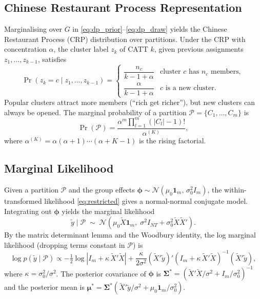 \documentclass[margin=3in, 12pt]{article}
\newcommand{\Normal}{\mathcal{N}}
\newcommand{\1}{\mathbbm{1}}
\begin{document}
\subsection{Chinese Restaurant Process Representation}

Marginalising over $G$ in \eqref{eq:dp_prior}--\eqref{eq:dp_draw} yields
the Chinese Restaurant Process (CRP) distribution over partitions. Under
the CRP with concentration $\alpha$, the cluster label $z_k$ of CATT $k$,
given previous assignments $z_1,\ldots,z_{k-1}$, satisfies
\begin{equation}
  \Pr(z_k = c \mid z_1,\ldots,z_{k-1}) =
  \begin{cases}
    \dfrac{n_c}{k-1+\alpha} & \text{cluster } c \text{ has } n_c \text{ members},\\[6pt]
    \dfrac{\alpha}{k-1+\alpha} & c \text{ is a new cluster.}
  \end{cases}
  \label{eq:crp}
\end{equation}
Popular clusters attract more members (``rich get richer''), but new clusters
can always be opened. The marginal probability of a partition
$\mathcal{P} = \{C_1,\ldots,C_m\}$ is
\begin{equation}
  \Pr(\mathcal{P}) = \frac{\alpha^m \prod_{l=1}^{m}(|C_l|-1)!}{\alpha^{(K)}},
  \label{eq:crp_partition}
\end{equation}
where $\alpha^{(K)} = \alpha(\alpha+1)\cdots(\alpha+K-1)$ is the rising
factorial.

\subsection{Marginal Likelihood}

Given a partition $\mathcal{P}$ and the group effects
$\bm{\phi} \sim \Normal(\mu_0\mathbf{1}_m,\, \sigma_0^2 I_m)$, the
within-transformed likelihood \eqref{eq:restricted} gives a normal-normal
conjugate model. Integrating out $\bm{\phi}$ yields the marginal likelihood
\begin{equation}
  \tilde{y} \mid \mathcal{P}
  \;\sim\; \Normal\!\left(\mu_0 \tilde{X}\mathbf{1}_m,\;
    \sigma^2 I_{NT} + \sigma_0^2 \tilde{X}\tilde{X}'\right).
  \label{eq:marglik}
\end{equation}
By the matrix determinant lemma and the Woodbury identity, the log
marginal likelihood (dropping terms constant in $\mathcal{P}$) is
\begin{equation}
  \log p(\tilde{y}\mid\mathcal{P})
  \propto
  -\tfrac{1}{2}\log|I_m + \kappa\,\tilde{X}'\tilde{X}|
  + \frac{\kappa}{2\sigma^2}(\tilde{X}'\tilde{y})'
    (I_m + \kappa\,\tilde{X}'\tilde{X})^{-1}(\tilde{X}'\tilde{y}),
  \label{eq:logml}
\end{equation}
where $\kappa = \sigma_0^2/\sigma^2$. The posterior covariance of
$\bm{\phi}$ is $\bm{\Sigma}^* = (\tilde{X}'\tilde{X}/\sigma^2 +
I_m/\sigma_0^2)^{-1}$ and the posterior mean is
$\bm{\mu}^* = \bm{\Sigma}^*(\tilde{X}'\tilde{y}/\sigma^2 +
\mu_0\mathbf{1}_m/\sigma_0^2)$.
\end{document}
